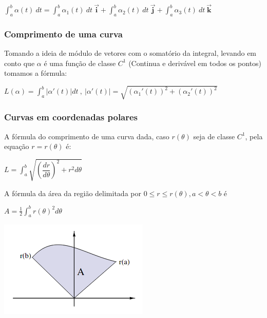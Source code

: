 \documentclass[letterpaper, 11pt]{article}
\begin{document}
\begin{center} $\int_{a}^{b} \alpha(t) \ dt = \int_{a}^{b} \alpha_1(t) \ dt \ \vec{\textbf{i}} + \int_{a}^{b} \alpha_2(t) \ dt \ \vec{\textbf{j}} +  \int_{a}^{b} \alpha_3(t) \ dt \ \vec{\textbf{k}}  $ \end{center}

\subsubsection{Comprimento de uma curva}
\label{sec:org28d1479}
Tomando a ideia de módulo de vetores com o somatório da integral, levando em conto que \(\alpha\) é uma função de classe \(C^1\) (Continua e derivável em todos os pontos) tomamos a fórmula:

\begin{center} $L(\alpha) = \int_{a}^{b} |\alpha'(t)| dt \ , \ |\alpha'(t)| = \sqrt{(\alpha_1'(t))^2 + (\alpha_2'(t))^2}$ \end{center}

\subsubsection{Curvas em coordenadas polares}
\label{sec:orgaae76d7}
A fórmula do comprimento de uma curva dada, caso \(r(\theta)\) seja de classe \(C^1\), pela equação \(r = r(\theta)\) é:

\begin{center} $L =\int_{a}^{b} \sqrt{(\dfrac{dr}{d\theta})^2 + r^2 d\theta}$ \end{center}

A fórmula da área da região delimitada por \(0 \le r \le r(\theta), a < \theta < b\) é

\begin{center} $A =\frac{1}{2} \int_{a}^{b} r(\theta)^2 d\theta$ \end{center}

\begin{center}
\includegraphics[width=.9\linewidth]{./img/areapolar.png}
\end{center}
\end{document}
